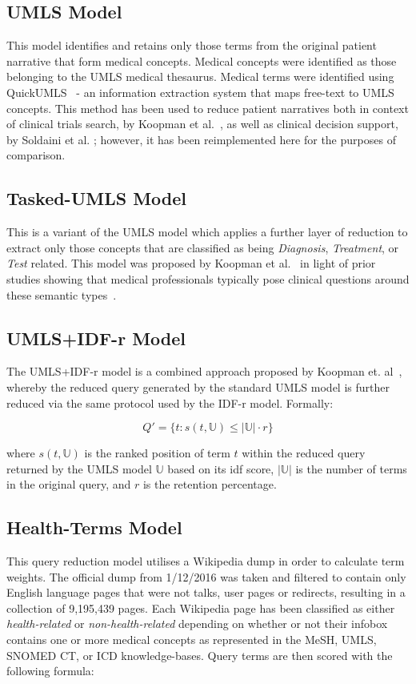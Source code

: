 \documentclass[a4paper]{report}
\begin{document}
\subsection{UMLS Model}
This model identifies and retains only those terms from the original patient narrative that form medical concepts. Medical concepts were identified as those belonging to the UMLS medical thesaurus. Medical terms were identified using QuickUMLS~\cite{Soldaini2016QuickumlsAF} - an information extraction system that maps free-text to UMLS concepts. This method has been used to reduce patient narratives both in context of clinical trials search, by Koopman et al.~\cite{koopman2017generating}, as well as clinical decision support, by Soldaini et al. \cite{Soldaini2015RetrievingML}; however, it has been reimplemented here for the purposes of comparison.

\subsection{Tasked-UMLS Model}
This is a variant of the UMLS model which applies a further layer of reduction to extract only those concepts that are classified as being \textit{Diagnosis}, \textit{Treatment}, or \textit{Test} related. This model was proposed by Koopman et al.~\citep{koopman2017generating} in light of prior studies showing that medical professionals typically pose clinical questions around these semantic types~\cite{Ely2000A-taxonomy-of-g}.

\subsection{UMLS+IDF-r Model}
The UMLS+IDF-r model is a combined approach proposed by Koopman et. al~\citep{koopman2017generating}, whereby the reduced query generated by the standard UMLS model is further reduced via the same protocol used by the IDF-r model. Formally:

$$Q' = \{ t : s(t,\mathbb{U}) \leq |\mathbb{U}| \cdot r \}$$

where $s(t,\mathbb{U})$ is the ranked position of term $t$ within the reduced query returned by the UMLS model $\mathbb{U}$ based on its idf score, $|\mathbb{U}|$ is the number of terms in the original query, and $r$ is the retention percentage.

\subsection{Health-Terms Model}
This query reduction model utilises a Wikipedia dump in order to calculate term weights. The official dump from 1/12/2016 was taken and filtered to contain only English language pages that were not talks, user pages or redirects, resulting in a collection of 9,195,439 pages. Each Wikipedia page has been classified as either \textit{health-related} or \textit{non-health-related} depending on whether or not their infobox contains one or more medical concepts as represented in the MeSH, UMLS, SNOMED CT, or ICD knowledge-bases. Query terms are then scored with the following formula:
\end{document}
